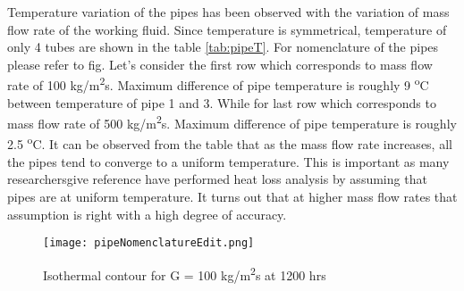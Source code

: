 Temperature variation of the pipes has been observed with the variation of mass flow rate of the working fluid. Since temperature is symmetrical, temperature of only 4 tubes are shown in the table \ref{tab:pipeT}. For nomenclature of the pipes please refer to fig.
Let's consider the first row which corresponds to mass flow rate of 100 kg/m\textsuperscript{2}s. Maximum difference of pipe temperature is roughly 9 \textsuperscript{o}C between temperature of pipe 1 and 3. While for last row which corresponds to mass flow rate of 500 kg/m\textsuperscript{2}s. Maximum difference of pipe temperature is roughly 2.5 \textsuperscript{o}C. It can be observed from the table that as the mass flow rate increases, all the pipes tend to converge to a uniform temperature. This is important as many researchers{give reference} have performed heat loss analysis by assuming that pipes are at uniform temperature. It turns out that at higher mass flow rates that assumption is right with a high degree of accuracy.


\begin{figure}[H]
\begin{center}
\texttt{[image: pipeNomenclatureEdit.png]}
\caption{Isothermal contour for G = 100 kg/m\textsuperscript{2}s at 1200 hrs}
\label{fig:isothermG1001200hrs}
\end{center}
\end{figure} 

